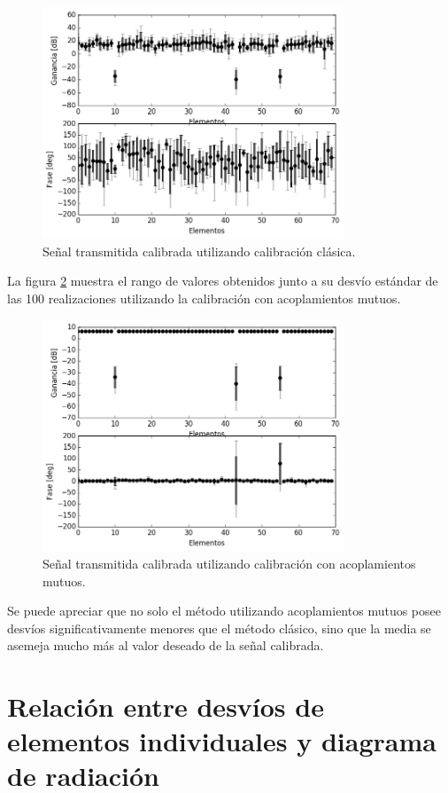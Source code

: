 \begin{figure}[H]
	\centering
	\includegraphics[width=9cm]{gfx/classicalMontecarlo.png}
	\caption{Señal transmitida calibrada utilizando calibración clásica.}
	\label{fig:classicalMontecarlo}
\end{figure}

La figura \ref{fig:mutualMontecarlo} muestra  el rango de valores obtenidos junto a su desvío estándar de las 100 
realizaciones utilizando la calibración con acoplamientos mutuos.

\begin{figure}[H]
	\centering
	\includegraphics[width=9cm]{gfx/mutualMontecarlo.png}
	\caption{Señal transmitida calibrada utilizando calibración con acoplamientos mutuos.}
	\label{fig:mutualMontecarlo}
\end{figure}

Se puede apreciar que no solo el método utilizando acoplamientos mutuos posee desvíos significativamente menores que el 
método clásico, sino que la media se asemeja mucho más al valor deseado de la señal calibrada.


\section{Relación entre desvíos de elementos individuales y diagrama de radiación}

